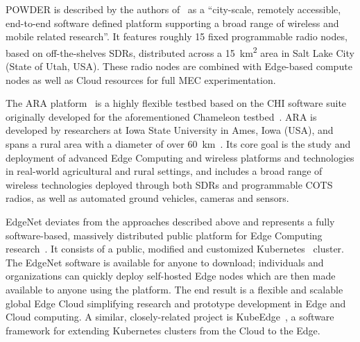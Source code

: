 \gls{POWDER} is described by the authors of~\cite{breen2020powder} as a ``city-scale, remotely accessible, end-to-end software defined platform supporting a broad range of wireless and mobile related research''.
It features roughly \num{15} fixed programmable radio nodes, based on off-the-shelves \glspl{SDR}, distributed across a \SI{15}{\kilo\meter\squared} area in Salt Lake City (State of Utah, \gls{USA}).
These radio nodes are combined with Edge-based compute nodes as well as Cloud resources for full \gls{MEC} experimentation.

The \gls{ARA} platform~\cite{zhang2022ara} is a highly flexible testbed based on the \gls{CHI} software suite originally developed for the aforementioned Chameleon testbed~\cite{keahey2020lessons}.
\gls{ARA} is developed by researchers at Iowa State University in Ames, Iowa (\gls{USA}), and spans a rural area with a diameter of over \SI{60}{\kilo\meter}~\cite{zhang2022ara}.
Its core goal is the study and deployment of advanced Edge Computing and wireless platforms and technologies in real-world agricultural and rural settings, and includes a broad range of wireless technologies deployed through both \glspl{SDR} and programmable \gls{COTS} radios, as well as automated ground vehicles, cameras and sensors.

EdgeNet deviates from the approaches described above and represents a fully software-based, massively distributed public platform for Edge Computing research~\cite{cappos2018edgenet,senel2021edgenet1,senel2021edgenet2}.
It consists of a public, modified and customized Kubernetes~\cite{kubernetes} cluster.
The EdgeNet software is available for anyone to download;
individuals and organizations can quickly deploy self-hosted Edge nodes which are then made available to anyone using the platform.
The end result is a flexible and scalable global Edge Cloud simplifying research and prototype development in Edge and Cloud computing.
A similar, closely-related project is KubeEdge~\cite{xiong2018extend}, a software framework for extending Kubernetes clusters from the Cloud to the Edge.

